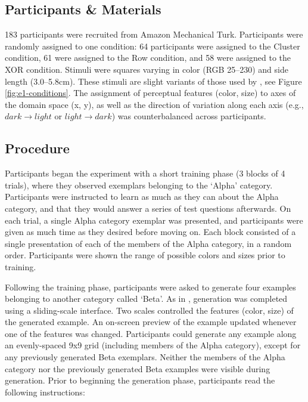 \documentclass[12pt]{article}
\begin{document}
\begin{flushleft}
\subsection{Participants \& Materials}

183 participants were recruited from Amazon Mechanical Turk. Participants were randomly assigned to one condition: 64 participants were assigned to the Cluster condition, 61 were assigned to the Row condition, and 58 were assigned to the XOR condition. Stimuli were squares varying in color (RGB 25--230) and side length (3.0--5.8cm). These stimuli are slight variants of those used by \cite{conaway2016similar}, see Figure \ref{fig:e1-conditions}. The assignment of perceptual features (color, size) to axes of the domain space (x, y), as well as the direction of variation along each axis (e.g., $dark \rightarrow light$ or $light \rightarrow dark$) was counterbalanced across participants.

\subsection{Procedure}

Participants began the experiment with a short training phase (3 blocks of 4 trials), where they observed exemplars belonging to the `Alpha' category. Participants were instructed to learn as much as they can about the Alpha category, and that they would answer a series of test questions afterwards. On each trial, a single Alpha category exemplar was presented, and participants were given as much time as they desired before moving on. Each block consisted of a single presentation of each of the members of the Alpha category, in a random order. Participants were shown the range of possible colors and sizes prior to training.

Following the training phase, participants were asked to generate four examples belonging to another category called `Beta'. As in \citet{jern2013probabilistic}, generation was completed using a sliding-scale interface. Two scales controlled the features (color, size) of the generated example. An on-screen preview of the example updated whenever one of the features was changed. Participants could generate any example along an evenly-spaced 9x9 grid (including members of the Alpha category), except for any previously generated Beta exemplars. Neither the members of the Alpha category nor the previously generated Beta examples were visible during generation. Prior to beginning the generation phase, participants read the following instructions:


\end{flushleft}
\end{document}
